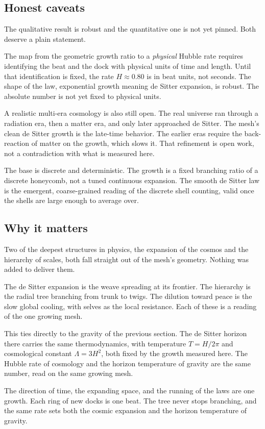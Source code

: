 \subsection{Honest caveats}

The qualitative result is robust and the quantitative one is not yet pinned. Both deserve a plain statement.

The map from the geometric growth ratio to a \emph{physical} Hubble rate requires identifying the beat and the dock with physical units of time and length. Until that identification is fixed, the rate $H \approx 0.80$ is in beat units, not seconds. The shape of the law, exponential growth meaning de Sitter expansion, is robust. The absolute number is not yet fixed to physical units.

A realistic multi-era cosmology is also still open. The real universe ran through a radiation era, then a matter era, and only later approached de Sitter. The mesh's clean de Sitter growth is the late-time behavior. The earlier eras require the back-reaction of matter on the growth, which slows it. That refinement is open work, not a contradiction with what is measured here.

The base is discrete and deterministic. The growth is a fixed branching ratio of a discrete honeycomb, not a tuned continuous expansion. The smooth de Sitter law is the emergent, coarse-grained reading of the discrete shell counting, valid once the shells are large enough to average over.

\subsection{Why it matters}

Two of the deepest structures in physics, the expansion of the cosmos and the hierarchy of scales, both fall straight out of the mesh's geometry. Nothing was added to deliver them.

The de Sitter expansion is the weave spreading at its frontier. The hierarchy is the radial tree branching from trunk to twigs. The dilution toward peace is the slow global cooling, with selves as the local resistance. Each of these is a reading of the one growing mesh.

This ties directly to the gravity of the previous section. The de Sitter horizon there carries the same thermodynamics, with temperature $T = H / 2\pi$ and cosmological constant $\Lambda = 3 H^2$, both fixed by the growth measured here. The Hubble rate of cosmology and the horizon temperature of gravity are the same number, read on the same growing mesh.

\begin{result}
The direction of time, the expanding space, and the running of the laws are one growth. Each ring of new docks is one beat. The tree never stops branching, and the same rate sets both the cosmic expansion and the horizon temperature of gravity.
\end{result}
